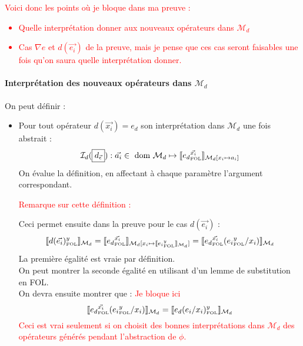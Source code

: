 \documentclass[12pt]{article}
\newcommand{\FOL}{\ensuremath{\textup{\tiny{}FOL}}}
\newcommand{\M}{\ensuremath{\mathcal{M}}}
\newcommand{\raph}[1]{\textcolor{red}{#1}}
\begin{document}
\raph{%
  Voici donc les points où je bloque dans ma preuve :
  \begin{itemize}
  \item
    Quelle interprétation donner aux nouveaux opérateurs dans $\mathcal{M}_d$
  \item
    Cas $\nabla e$ et $d(\vec{e_i})$ de la preuve, mais je pense que ces cas seront faisables une fois qu'on saura quelle interprétation donner.
  \end{itemize}}

\paragraph{Interprétation des nouveaux opérateurs dans $\mathcal{M}_d$}
On peut définir :
\begin{itemize}
\item
  Pour tout opérateur $d(\vec{x_i}) = e_d$ son interprétation dans $\mathcal{M}_d$ une fois abstrait :
  \[
    \mathcal{I}_d(\framebox{$d_{\vec{\epsilon}}$}) : \vec{a_i} \in \textup{ dom } \mathcal{M}_d \mapsto
    \llbracket {e_d}_\FOL^{\vec{x_i}} \rrbracket_{\mathcal{M}_d[x_i \mapsto a_i]}
  \]
  On évalue la définition, en affectant à chaque paramètre l'argument correspondant.

  \raph{Remarque sur cette définition :}
  
  Ceci permet ensuite dans la preuve pour le cas $d(\vec{e_i})$ :
  \[
    \llbracket d(\vec{e_i})_\FOL^y \rrbracket_{\mathcal{M}_d} =
    \llbracket {e_d}_\FOL^{\vec{x_i}} \rrbracket_{\mathcal{M}_d[x_i \mapsto \llbracket {e_i}_\FOL^y \rrbracket_{\mathcal{M}_d} ]} =
    \llbracket {e_d}_\FOL^{\vec{x_i}} ({e_i}_\FOL^y/{x_i}) \rrbracket_{\mathcal{M}_d}
  \]
  La première égalité est vraie par définition.\\
  On peut montrer la seconde égalité en utilisant d'un lemme de substitution en FOL.\\
  On devra ensuite montrer que : \raph{ Je bloque ici }
  \[
    \llbracket {e_d}_\FOL^{\vec{x_i}} ({e_i}_\FOL^y/{x_i}) \rrbracket_{\mathcal{M}_d} =
    \llbracket {e_d(e_i/x_i)_\FOL^y} \rrbracket_{\mathcal{M}_d}
  \]
  \raph{Ceci est vrai seulement si on choisit des bonnes interprétations dans $\M_d$ des opérateurs générés pendant l'abstraction de $\phi$.}


\end{itemize}
\end{document}

